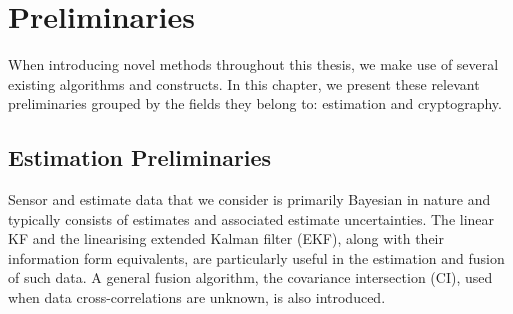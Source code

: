 
\chapter{Preliminaries}\label{ch:prelims}
When introducing novel methods throughout this thesis, we make use of several existing algorithms and constructs. In this chapter, we present these relevant preliminaries grouped by the fields they belong to: estimation and cryptography.

% 
%                                                                                                      
%                                                                                                      
%                                                                                                      
% 

\section{Estimation Preliminaries}\label{sec:prelims:est_prelims}
Sensor and estimate data that we consider is primarily Bayesian in nature and typically consists of estimates and associated estimate uncertainties. The linear KF and the linearising extended Kalman filter (EKF), along with their information form equivalents, are particularly useful in the estimation and fusion of such data. A general fusion algorithm, the covariance intersection (CI), used when data cross-correlations are unknown, is also introduced.

% 
% 

